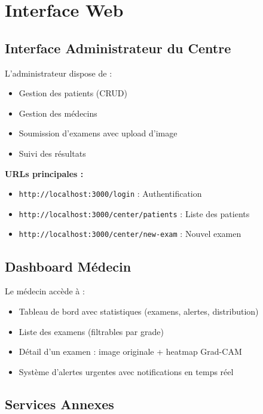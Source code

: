 \documentclass[12pt,a4paper,oneside]{report}
\begin{document}
\section{Interface Web}

\subsection{Interface Administrateur du Centre}

L'administrateur dispose de :
\begin{itemize}
    \item Gestion des patients (CRUD)
    \item Gestion des médecins
    \item Soumission d'examens avec upload d'image
    \item Suivi des résultats
\end{itemize}

\textbf{URLs principales :}
\begin{itemize}
    \item \texttt{http://localhost:3000/login} : Authentification
    \item \texttt{http://localhost:3000/center/patients} : Liste des patients
    \item \texttt{http://localhost:3000/center/new-exam} : Nouvel examen
\end{itemize}

\subsection{Dashboard Médecin}

Le médecin accède à :
\begin{itemize}
    \item Tableau de bord avec statistiques (examens, alertes, distribution)
    \item Liste des examens (filtrables par grade)
    \item Détail d'un examen : image originale + heatmap Grad-CAM
    \item Système d'alertes urgentes avec notifications en temps réel
\end{itemize}

\subsection{Services Annexes}
\end{document}
